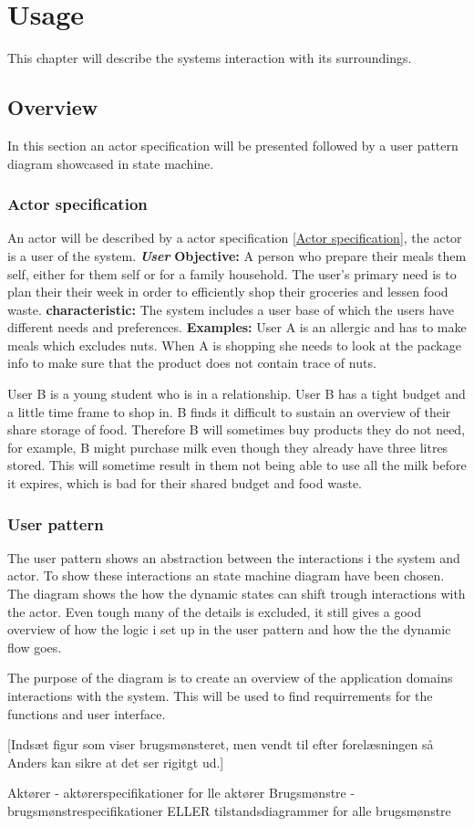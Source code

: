 \chapter{Usage}
This chapter will describe the systems interaction with its surroundings.

\section{Overview}
In this section an actor specification will be presented followed by a user pattern diagram showcased in state machine.

\subsection{Actor specification}
An actor will be described by a actor specification \ref{Actor specification}, the actor is a user of the system.
\vline
\textbf{\textit{User}}\label{Actor specification}
\textbf{Objective:} A person who prepare their meals them self, either for them self or for a family household. The user's primary need is to plan their their week in order to efficiently shop their groceries and lessen food waste.
\textbf{characteristic:} The system includes a user base of which the users have different needs and preferences.
\textbf{Examples:} User A is an allergic and has to make meals which excludes nuts. When A is shopping she needs to look at the package info to make sure that the product does not contain trace of nuts.

User B is a young student who is in a relationship. User B has a tight budget and a little time frame to shop in. B finds it difficult to sustain an overview of their share storage of food. Therefore B will sometimes buy products they do not need, for example, B might purchase milk even though they already have three litres stored. This will sometime result in them not being able to use all the milk before it expires, which is bad for their shared budget and food waste.
\vline

\subsection{User pattern}
The user pattern shows an abstraction between the interactions i the system and actor. To show these interactions an state machine diagram have been chosen. The diagram shows the how the dynamic states can shift trough interactions with the actor. Even tough many of the details is excluded, it still gives a good overview of how the logic i set up in the user pattern and how the the dynamic flow goes. 

The purpose of the diagram is to create an overview of the application domains interactions with the system. This will be used to find requirrements for the functions and user interface.

[Indsæt figur som viser brugsmønsteret, men vendt til efter forelæsningen så Anders kan sikre at det ser rigitgt ud.]

	Aktører - aktørerspecifikationer for lle aktører
	Brugsmønstre - brugsmønstrespecifikationer ELLER tilstandsdiagrammer for alle brugsmønstre